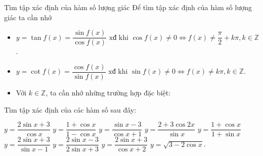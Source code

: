 \begin{dang}{Tìm tập xác định của hàm số lượng giác}
	Để tìm tập xác định của hàm số lượng giác ta cần nhớ
	\begin{itemize}
		\item $y=\tan f(x)=\dfrac{\sin f(x)}{\cos f(x)} \text{ xđ khi }\cos f(x)\neq 0 \Leftrightarrow f(x)\neq \dfrac{\pi}{2}+k\pi, k\in \mathbb{Z}$.
		\item $y=\cot f(x)=\dfrac{\cos f(x)}{\sin f(x)} \text{ xđ khi } \sin f(x)\neq 0 \Leftrightarrow f(x)\neq k\pi, k\in \mathbb{Z}$.		
		\item Với $k\in \mathbb{Z}$, ta cần nhớ những trường hợp đặc biệt:
	\end{itemize}
\end{dang}
\viduminhhoa
\begin{vd}
	Tìm tập xác định của các hàm số sau đây:
	\begin{tasks}
		\task $y=\dfrac{2\sin x+3}{\cos x}$ 
		\task $y=\dfrac{1+\cos x}{1-\cos x}$
		\task $y=\dfrac{\sin x-3}{\cos x+1}$ 
		\task $y=\dfrac{2+3\cos 2x}{\sin x}$ 
		\task $y=\dfrac{1+\cos x}{1+\sin x}$
		\task $y=\dfrac{2\sin x+3}{\sin x-1}$ 
		\task $y=\dfrac{2\sin x-3}{2\sin x+3}$ 
		\task $y=\dfrac{2\sin x+3}{\cos x+2}$ 
		\task $y=\sqrt{3-2\cos x}$.
	\end{tasks}
\end{vd}
